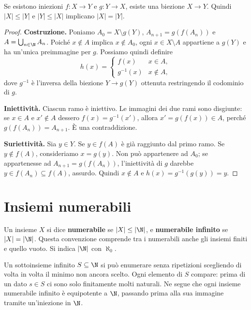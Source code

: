 \begin{teorema}\label{teo:csb}
Se esistono iniezioni $f:X\to Y$ e $g:Y\to X$, esiste una biezione $X\to Y$. Quindi $|X|\le|Y|$ e $|Y|\le|X|$ implicano $|X|=|Y|$.
\end{teorema}
\begin{proof}
\textbf{Costruzione.} Poniamo $A_0=X\setminus g(Y)$, $A_{n+1}=g(f(A_n))$ e $A=\bigcup_{n\in\N}A_n$. Poiché $x\notin A$ implica $x\notin A_0$, ogni $x\in X\setminus A$ appartiene a $g(Y)$ e ha un'unica preimmagine per $g$. Possiamo quindi definire
\[
h(x)=\begin{cases}f(x)&x\in A,\\g^{-1}(x)&x\notin A,\end{cases}
\]
dove $g^{-1}$ è l'inversa della biezione $Y\to g(Y)$ ottenuta restringendo il codominio di $g$.

\textbf{Iniettività.} Ciascun ramo è iniettivo. Le immagini dei due rami sono disgiunte: se $x\in A$ e $x'\notin A$ dessero $f(x)=g^{-1}(x')$, allora $x'=g(f(x))\in A$, perché $g(f(A_n))=A_{n+1}$. È una contraddizione.

\textbf{Suriettività.} Sia $y\in Y$. Se $y\in f(A)$ è già raggiunto dal primo ramo. Se $y\notin f(A)$, consideriamo $x=g(y)$. Non può appartenere ad $A_0$; se appartenesse ad $A_{n+1}=g(f(A_n))$, l'iniettività di $g$ darebbe $y\in f(A_n)\subseteq f(A)$, assurdo. Quindi $x\notin A$ e $h(x)=g^{-1}(g(y))=y$.
\end{proof}

\section{Insiemi numerabili}
\begin{definizione}
Un insieme $X$ si dice \textbf{numerabile} se $|X|\le|\N|$, e \textbf{numerabile infinito} se $|X|=|\N|$. Questa convenzione comprende tra i numerabili anche gli insiemi finiti e quello vuoto. Si indica $|\N|$ con $\aleph_0$.
\end{definizione}

Un sottoinsieme infinito $S\subseteq\N$ si può enumerare senza ripetizioni scegliendo di volta in volta il minimo non ancora scelto. Ogni elemento di $S$ compare: prima di un dato $s\in S$ ci sono solo finitamente molti naturali. Ne segue che ogni insieme numerabile infinito è equipotente a $\N$, passando prima alla sua immagine tramite un'iniezione in $\N$.

